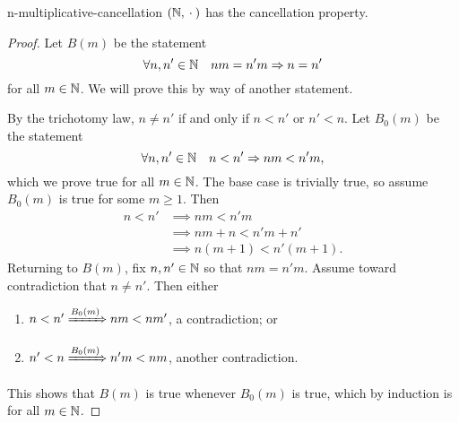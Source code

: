 \documentclass[master.tex]{subfiles}
\begin{document}
    \begin{lemma}{}{n-multiplicative-cancellation}
        $(\mathbb{N}, {}\cdot{}{})$ has the cancellation property.
        \hr{}
        \begin{proof}
            Let $B(m)$ be the statement
            \[
                \forall n, n' \in \mathbb{N} \quad nm = n'm \Rightarrow n = n'  
            \]
            for all $m \in \mathbb{N}$.
            We will prove this by way of another statement.

            By the trichotomy law, $n \neq n'$ if and only if $n < n'$ or $n' < n$.
            Let $B_0(m)$ be the statement
            \[
                  \forall n, n' \in \mathbb{N} \quad n < n' \Rightarrow nm < n'm
            ,\]
            which we prove true for all $m \in \mathbb{N}$.
            The base case is trivially true, so assume $B_0(m)$ is true for some $m \geq 1$.
            Then
            \begin{align*}
                n < n' &\implies nm < n'm \\
                &\implies nm + n < n'm + n' \\
                &\implies n(m + 1) < n'(m + 1).
            \end{align*}
            Returning to $B(m)$, fix $n, n' \in \mathbb{N}$ so that $nm = n'm$.
            Assume toward contradiction that $n \neq n'$.
            Then either
            \begin{enumerate}
                \item $n < n' \xRightarrow{B_0(m)} nm < nm'$, a contradiction; or
                \item $n' < n \xRightarrow{B_0(m)} n'm < nm$, another contradiction.
            \end{enumerate}
            This shows that $B(m)$ is true whenever $B_0(m)$ is true, which by induction is for all $m \in \mathbb{N}$.
        \end{proof}
    \end{lemma}
\end{document}
